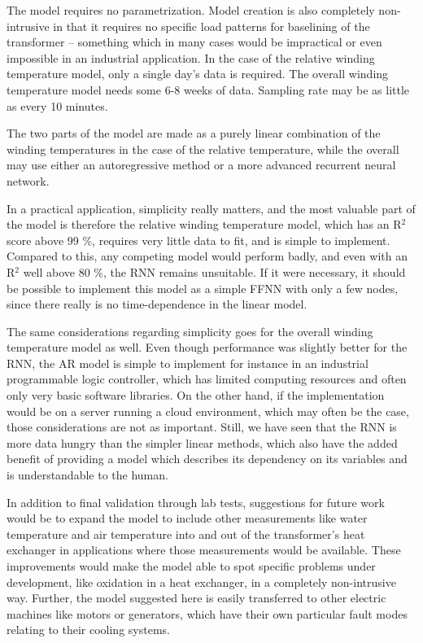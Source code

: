 \documentclass[]{article}
\begin{document}
The model requires no parametrization. Model creation is also completely non-intrusive in that it requires no specific load patterns for baselining of the transformer -- something which in many cases would be impractical or even impossible in an industrial application. In the case of the relative winding temperature model, only a single day's data is required. The overall winding temperature model needs some 6-8 weeks of data. Sampling rate may be as little as every 10 minutes.

The two parts of the model are made as a purely linear combination of the winding temperatures in the case of the relative temperature, while the overall may use either an autoregressive method or a more advanced recurrent neural network. 

In a practical application, simplicity really matters, and the most valuable part of the model is therefore the relative winding temperature model, which has an R$^2$ score above 99 \%, requires very little data to fit, and is simple to implement. Compared to this, any competing model would perform badly, and even with an R$^2$ well above 80 \%, the RNN remains unsuitable. If it were necessary, it should be possible to implement this model as a simple FFNN with only a few nodes, since there really is no time-dependence in the linear model.

The same considerations regarding simplicity goes for the overall winding temperature model as well. Even though performance was slightly better for the RNN, the AR model is simple to implement for instance in an industrial programmable logic controller, which has limited computing resources and often only very basic software libraries. On the other hand, if the implementation would be on a server running a cloud environment, which may often be the case, those considerations are not as important. Still, we have seen that the RNN is more data hungry than the simpler linear methods, which also have the added benefit of providing a model which describes its dependency on its variables and is understandable to the human.

In addition to final validation through lab tests, suggestions for future work would be to expand the model to include other measurements like water temperature and air temperature into and out of the transformer's heat exchanger in applications where those measurements would be available. These improvements would make the model able to spot specific problems under development, like oxidation in a heat exchanger, in a completely non-intrusive way. Further, the model suggested here is easily transferred to other electric machines like motors or generators, which have their own particular fault modes relating to their cooling systems.





\end{document}
